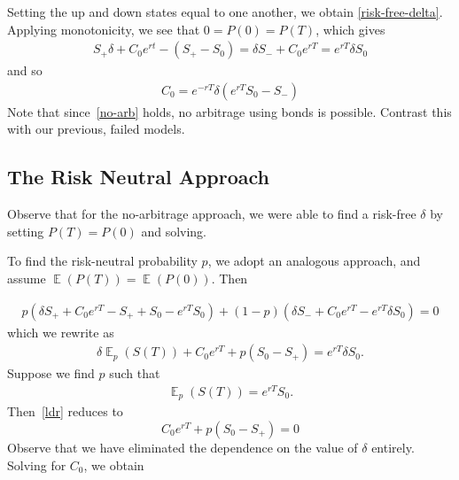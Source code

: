 \documentclass[12pt]{amsbook}
\DeclareMathOperator{\ex}{\mathbb{E}}
\theoremstyle{plain}
\theoremstyle{definition}
\theoremstyle{remark}
\numberwithin{equation}{section}  %
\begin{document}
Setting the up and down states equal to one another, we obtain
\eqref{risk-free-delta}. Applying monotonicity, we see that
$0 = P(0) = P(T)$, which gives
\begin{equation}\label{no-arb}
	\begin{split}
		S_{+} \delta + C_{0}e^{rt} - (S_{+} - S_{0})
		= 	\delta S_{-} + C_{0} e^{rT} = e^{rT} \delta S_{0} 
	\end{split}
\end{equation}
and so
\begin{equation}
	\begin{split}
		C_{0} = e^{-rT}\delta(e^{rT} S_{0} - S_{-})
	\end{split}
\end{equation}
Note that since~\eqref{no-arb} holds, no arbitrage using bonds is
possible. Contrast this with our previous, failed models. 
\subsection{The Risk Neutral Approach}
Observe that for the no-arbitrage approach, we were able to find a risk-free
$\delta$ by setting $P(T) = P(0)$ and solving.

To find the risk-neutral probability $p$, we adopt an analogous approach,
and assume $\ex(P(T)) = \ex(P(0))$. Then

\begin{equation*}
	\begin{split}
		p(\delta S_{+} + C_{0} e^{rT} - S_{+} + S_{0} - e^{rT}S_{0})
		+ (1-p)(\delta S_{-} + C_{0} e^{rT} - e^{rT} \delta S_{0}) = 0
	\end{split}
\end{equation*}
which we rewrite as
\begin{equation}
	\label{ldr}
	\begin{split}
		\delta \ex_{p}(S(T)) + C_{0} e^{rT} + p(S_{0} - S_{+}) = e^{rT} \delta
		S_{0}.
	\end{split}
\end{equation}
Suppose we find $p$ such that 
\begin{equation}\label{fpp}
	\begin{split}
		\ex_{p}(S(T)) = e^{rT} S_{0}.
	\end{split}
\end{equation}
Then~\eqref{ldr} reduces to
\begin{equation*}
	C_{0} e^{rT} + p(S_{0} - S_{+}) = 0 
\end{equation*}
Observe that we have eliminated the dependence on the value of $\delta$
entirely. Solving for $C_{0}$, we obtain
\end{document}
